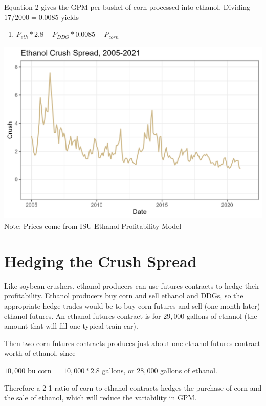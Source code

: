 \documentclass[
  letterpaper,
  DIV=11,
  numbers=noendperiod]{scrreprt}
\providecommand{\tightlist}{%
  \setlength{\itemsep}{0pt}\setlength{\parskip}{0pt}}\usepackage{longtable,booktabs,array}
\begin{document}
Equation 2 gives the GPM per bushel of corn processed into ethanol.
Dividing \(17/2000 = 0.0085\) yields

\begin{enumerate}
\def\labelenumi{\arabic{enumi}.}
\setcounter{enumi}{2}
\tightlist
\item
  \(P_{eth}*2.8 + P_{DDG}*0.0085 - P_{corn}\)
\end{enumerate}

\includegraphics{assets/ECrushSpread.png} Note: Prices come from ISU
Ethanol Profitability Model

\hypertarget{hedging-the-crush-spread}{%
\section{Hedging the Crush Spread}\label{hedging-the-crush-spread}}

Like soybean crushers, ethanol producers can use futures contracts to
hedge their profitability. Ethanol producers buy corn and sell ethanol
and DDGs, so the appropriate hedge trades would be to buy corn futures
and sell (one month later) ethanol futures. An ethanol futures contract
is for \(29,000\) gallons of ethanol (the amount that will fill one
typical train car).

Then two corn futures contracts produces just about one ethanol futures
contract worth of ethanol, since

\(10,000\) bu corn \(= 10,000*2.8\) gallons, or \(28,000\) gallons of
ethanol.

Therefore a 2-1 ratio of corn to ethanol contracts hedges the purchase
of corn and the sale of ethanol, which will reduce the variability in
GPM.
\end{document}
